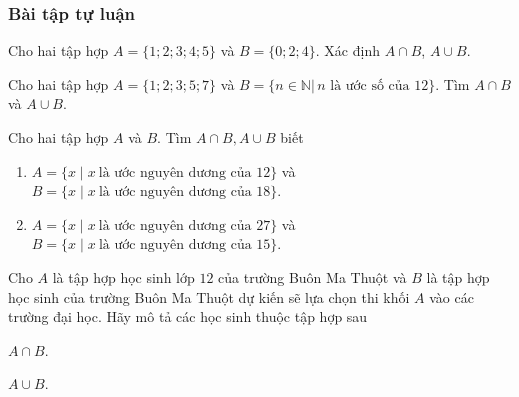 \subsubsection{Bài tập tự luận}
\begin{bt}%
	Cho hai tập hợp $A=\{ 1;2;3;4;5\}$ và $B=\{ 0;2;4\}$. Xác định $A\cap B$, $A\cup B$.
\end{bt}
\begin{bt}%
	Cho hai tập hợp $A=\{1;2;3;5;7\}$ và  $B=\{n\in \mathbb{N} |\, n \text{ là ước số của } 12\}$. Tìm $A\cap B$  và $A\cup B$.
\end{bt}
\begin{bt}%
	Cho hai tập hợp $A$ và $B$. Tìm $A\cap B, A\cup B$ biết
	\begin{enumerate}
		\item $A=\{x\mid x\ \text{là ước nguyên dương của 12} \}$ và 	$B=\{x\mid x\ \text{là ước nguyên dương của 18} \}$.
		\item $A=\{x\mid x\ \text{là ước nguyên dương của 27}\}$ và $B=\{x\mid x\ \text{là ước nguyên dương của 15} \}$.
	\end{enumerate}
\end{bt}
\begin{bt}%
	Cho $A$ là tập hợp học sinh lớp $12$ của trường Buôn Ma Thuột và $B$ là tập hợp học sinh của trường Buôn Ma Thuột dự kiến sẽ lựa chọn thi khối $A$ vào các trường đại học. Hãy mô tả các học sinh thuộc tập hợp sau
	\begin{enumEX}{2}
		\item $A\cap B$.
		\item $A\cup B$.
	\end{enumEX}
\end{bt}
